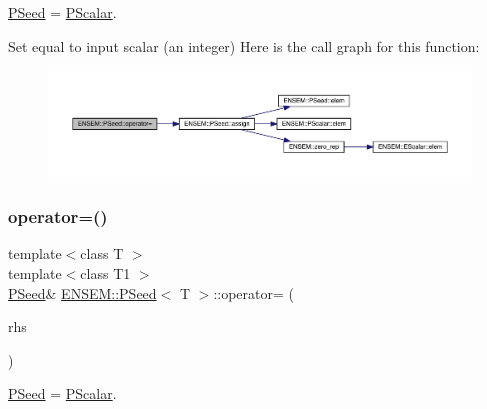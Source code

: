 \mbox{\hyperlink{classENSEM_1_1PSeed}{P\+Seed}} = \mbox{\hyperlink{classENSEM_1_1PScalar}{P\+Scalar}}. 

Set equal to input scalar (an integer) Here is the call graph for this function\+:
\nopagebreak
\begin{figure}[H]
\begin{center}
\leavevmode
\includegraphics[width=350pt]{dc/d14/classENSEM_1_1PSeed_aa7d9ec1f6a7cca8ee109c29d75482350_cgraph}
\end{center}
\end{figure}
\mbox{\label{classENSEM_1_1PSeed_aa7d9ec1f6a7cca8ee109c29d75482350}} 
\subsubsection{\texorpdfstring{operator=()}{operator=()}\hspace{0.1cm}{\footnotesize\ttfamily [3/6]}}
{\footnotesize\ttfamily template$<$class T $>$ \\
template$<$class T1 $>$ \\
\mbox{\hyperlink{classENSEM_1_1PSeed}{P\+Seed}}\& \mbox{\hyperlink{classENSEM_1_1PSeed}{E\+N\+S\+E\+M\+::\+P\+Seed}}$<$ T $>$\+::operator= (\begin{DoxyParamCaption}\item[{const \mbox{\hyperlink{classENSEM_1_1PScalar}{P\+Scalar}}$<$ T1 $>$ \&}]{rhs }\end{DoxyParamCaption})\hspace{0.3cm}{\ttfamily [inline]}}



\mbox{\hyperlink{classENSEM_1_1PSeed}{P\+Seed}} = \mbox{\hyperlink{classENSEM_1_1PScalar}{P\+Scalar}}. 

